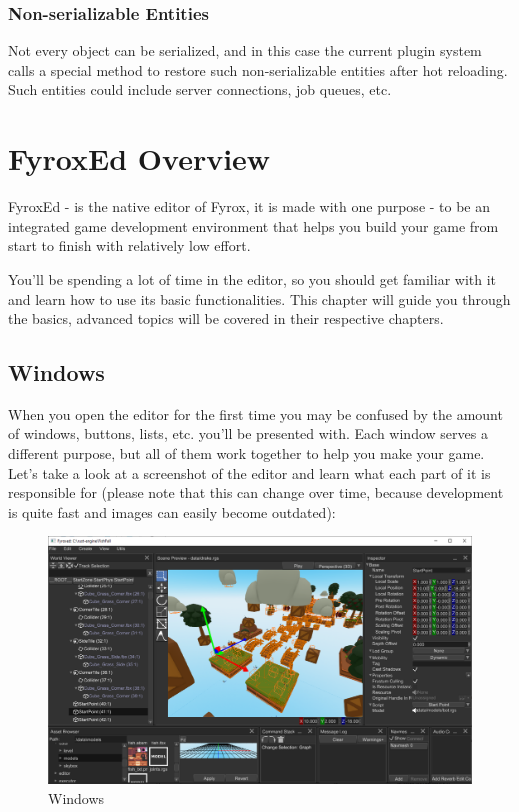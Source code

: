 \documentclass[
]{book}
\theoremstyle{definition}
\theoremstyle{definition}
\theoremstyle{definition}
\theoremstyle{definition}
\theoremstyle{remark}
\begin{document}
\subsubsection{Non-serializable Entities}\label{non-serializable-entities}

Not every object can be serialized, and in this case the current plugin system calls a special method to restore such non-serializable entities after hot reloading. Such entities could include server connections, job queues, etc.

\section{FyroxEd Overview}\label{fyroxed-overview}

FyroxEd - is the native editor of Fyrox, it is made with one purpose - to be an integrated game development environment that helps you build your game from start to finish with relatively low effort.

You'll be spending a lot of time in the editor, so you should get familiar with it and learn how to use its basic functionalities. This chapter will guide you through the basics, advanced topics will be covered in their respective chapters.

\subsection{Windows}\label{windows}

When you open the editor for the first time you may be confused by the amount of windows, buttons, lists, etc. you'll be presented with. Each window serves a different purpose, but all of them work together to help you make your game. Let's take a look at a screenshot of the editor and learn what each part of it is responsible for (please note that this can change over time, because development is quite fast and images can easily become outdated):

\begin{figure}
\centering
\includegraphics{./images/beginning_overview.png}
\caption{Windows}
\end{figure}
\end{document}
